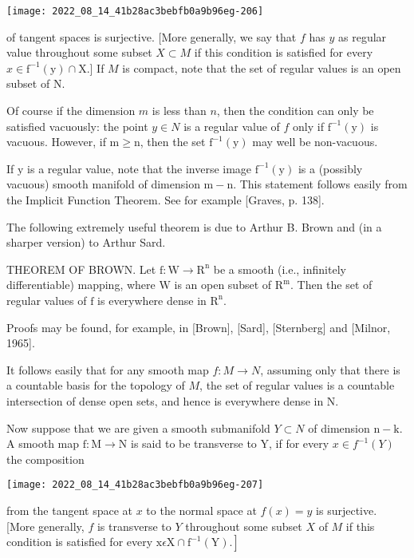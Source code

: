 \documentclass[10pt]{article}
\begin{document}
\texttt{[image: 2022\_08\_14\_41b28ac3bebfb0a9b96eg-206]}

of tangent spaces is surjective. [More generally, we say that $f$ has $y$ as regular value throughout some subset $X \subset M$ if this condition is satisfied for every $x \in \mathrm{f}^{-1}(\mathrm{y}) \cap \mathrm{X}$.] If $M$ is compact, note that the set of regular values is an open subset of $\mathrm{N}$.

Of course if the dimension $m$ is less than $n$, then the condition can only be satisfied vacuously: the point $y \in N$ is a regular value of $f$ only if $\mathrm{f}^{-1}(\mathrm{y})$ is vacuous. However, if $\mathrm{m} \geq \mathrm{n}$, then the set $\mathrm{f}^{-1}(\mathrm{y})$ may well be non-vacuous.

If $\mathrm{y}$ is a regular value, note that the inverse image $\mathrm{f}^{-1}(\mathrm{y})$ is a (possibly vacuous) smooth manifold of dimension $\mathrm{m}-\mathrm{n}$. This statement follows easily from the Implicit Function Theorem. See for example [Graves, p. 138].

The following extremely useful theorem is due to Arthur B. Brown and (in a sharper version) to Arthur Sard.

THEOREM OF BROWN. Let $\mathrm{f}: \mathrm{W} \rightarrow \mathrm{R}^{\mathrm{n}}$ be a smooth (i.e., infinitely differentiable) mapping, where $\mathrm{W}$ is an open subset of $\mathrm{R}^{\mathrm{m}}$. Then the set of regular values of $\mathrm{f}$ is everywhere dense in $\mathrm{R}^{\mathrm{n}}$.

Proofs may be found, for example, in [Brown], [Sard], [Sternberg] and [Milnor, 1965].

It follows easily that for any smooth map $f: M \rightarrow N$, assuming only that there is a countable basis for the topology of $M$, the set of regular values is a countable intersection of dense open sets, and hence is everywhere dense in $\mathrm{N}$.

Now suppose that we are given a smooth submanifold $Y \subset N$ of dimension $\mathrm{n}-\mathrm{k}$. A smooth map $\mathrm{f}: \mathrm{M} \rightarrow \mathrm{N}$ is said to be transverse to $\mathrm{Y}$, if for every $x \in f^{-1}(Y)$ the composition

\texttt{[image: 2022\_08\_14\_41b28ac3bebfb0a9b96eg-207]}

from the tangent space at $x$ to the normal space at $f(x)=y$ is surjective. [More generally, $f$ is transverse to $Y$ throughout some subset $X$ of $M$ if this condition is satisfied for every $\left.\mathrm{x} \epsilon \mathrm{X} \cap \mathrm{f}^{-1}(\mathrm{Y}) .\right]$
\end{document}
